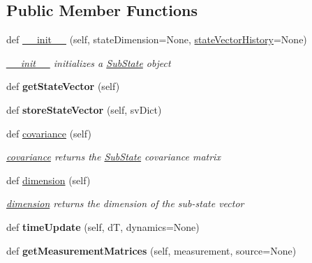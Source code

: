 \subsection*{Public Member Functions}
\begin{DoxyCompactItemize}
\item 
def \hyperlink{classSubStates_1_1SubState_a5ff829fb892680db4e3643e6b1f6cc9b}{\+\_\+\+\_\+init\+\_\+\+\_\+} (self, state\+Dimension=None, \hyperlink{classSubStates_1_1SubState_a24bf2de56fc3037d91cba43d28f3bf60}{state\+Vector\+History}=None)\hypertarget{classSubStates_1_1SubState_a5ff829fb892680db4e3643e6b1f6cc9b}{}\label{classSubStates_1_1SubState_a5ff829fb892680db4e3643e6b1f6cc9b}

\begin{DoxyCompactList}\small\item\em \hyperlink{classSubStates_1_1SubState_a5ff829fb892680db4e3643e6b1f6cc9b}{\+\_\+\+\_\+init\+\_\+\+\_\+} initializes a \hyperlink{classSubStates_1_1SubState}{Sub\+State} object \end{DoxyCompactList}\item 
def {\bfseries get\+State\+Vector} (self)\hypertarget{classSubStates_1_1SubState_a3ebd1a120f63ed477ee76999518a8828}{}\label{classSubStates_1_1SubState_a3ebd1a120f63ed477ee76999518a8828}

\item 
def {\bfseries store\+State\+Vector} (self, sv\+Dict)\hypertarget{classSubStates_1_1SubState_a65edbf44c6d93049cf0b2cb8e4b18b99}{}\label{classSubStates_1_1SubState_a65edbf44c6d93049cf0b2cb8e4b18b99}

\item 
def \hyperlink{classSubStates_1_1SubState_a4d863939fdb98b2739e1e737ec7496ae}{covariance} (self)
\begin{DoxyCompactList}\small\item\em \hyperlink{classSubStates_1_1SubState_a4d863939fdb98b2739e1e737ec7496ae}{covariance} returns the \hyperlink{classSubStates_1_1SubState}{Sub\+State} covariance matrix \end{DoxyCompactList}\item 
def \hyperlink{classSubStates_1_1SubState_a4aebea19a134cb871a7c0b6c2709546a}{dimension} (self)
\begin{DoxyCompactList}\small\item\em \hyperlink{classSubStates_1_1SubState_a4aebea19a134cb871a7c0b6c2709546a}{dimension} returns the dimension of the sub-\/state vector \end{DoxyCompactList}\item 
def {\bfseries time\+Update} (self, dT, dynamics=None)\hypertarget{classSubStates_1_1SubState_af07ac4d1435fdecff97cff84bae4eeab}{}\label{classSubStates_1_1SubState_af07ac4d1435fdecff97cff84bae4eeab}

\item 
def {\bfseries get\+Measurement\+Matrices} (self, measurement, source=None)\hypertarget{classSubStates_1_1SubState_a9dcc51af847b7b946089dd73c387ca19}{}\label{classSubStates_1_1SubState_a9dcc51af847b7b946089dd73c387ca19}

\end{DoxyCompactItemize}
